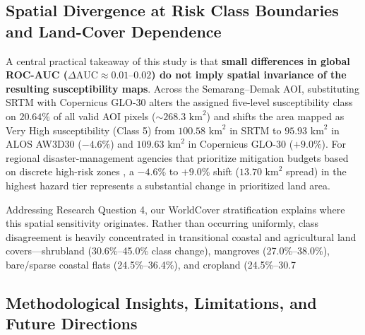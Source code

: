 \documentclass[11pt,twoside]{article}
\begin{document}
\subsection{Spatial Divergence at Risk Class Boundaries and Land-Cover Dependence}\label{subsec:discussion-spatial}

A central practical takeaway of this study is that \textbf{small differences in global ROC-AUC ($\Delta\text{AUC} \approx 0.01\text{--}0.02$) do not imply spatial invariance of the resulting susceptibility maps}. Across the Semarang--Demak AOI, substituting SRTM with Copernicus GLO-30 alters the assigned five-level susceptibility class on $20.64\%$ of all valid AOI pixels ($\sim 268.3\text{ km}^2$) and shifts the area mapped as Very High susceptibility (Class 5) from $100.58\text{ km}^2$ in SRTM to $95.93\text{ km}^2$ in ALOS AW3D30 ($-4.6\%$) and $109.63\text{ km}^2$ in Copernicus GLO-30 ($+9.0\%$). For regional disaster-management agencies that prioritize mitigation budgets based on discrete high-risk zones \cite{fereshtehpour2024,Tique2026}, a $-4.6\%$ to $+9.0\%$ shift ($13.70\text{ km}^2$ spread) in the highest hazard tier represents a substantial change in prioritized land area.

Addressing Research Question 4, our WorldCover stratification explains where this spatial sensitivity originates. Rather than occurring uniformly, class disagreement is heavily concentrated in transitional coastal and agricultural land covers---shrubland (30.6\%--45.0\% class change), mangroves (27.0\%--38.0\%), bare/sparse coastal flats (24.5\%--36.4\%), and cropland (24.5\%--30.7%

\subsection{Methodological Insights, Limitations, and Future Directions}\label{subsec:discussion-limitations}
\end{document}
